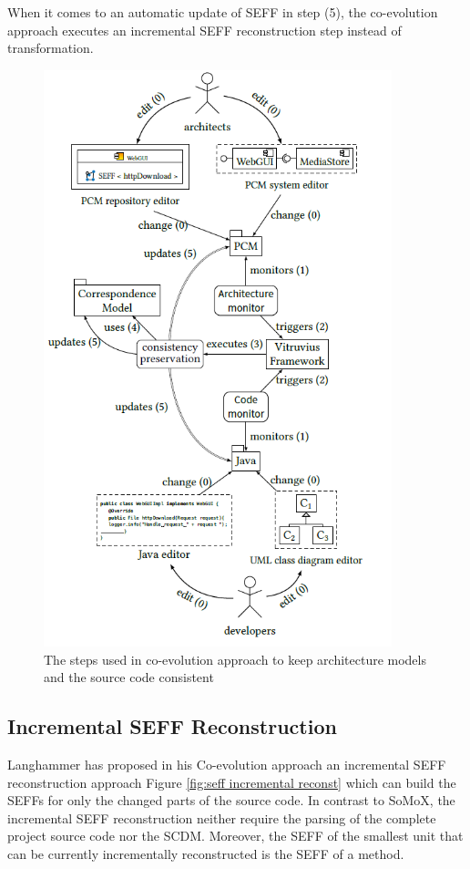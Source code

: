 When it comes to an automatic update of SEFF in step (5), the co-evolution approach executes an incremental SEFF reconstruction step instead of transformation. 


\begin{figure}[h]
\centering
\includegraphics[width=0.9\textwidth]{figures/coevolution_approach}
\caption{The steps used in co-evolution approach to keep architecture models and the source code consistent \cite{langhammer2015co}}
\label{fig:coevoloution approach}
\end{figure}

\subsection{Incremental SEFF Reconstruction}
\label{sec:Incremental SEFF Reconstruction}
Langhammer has proposed in his Co-evolution approach an incremental SEFF reconstruction approach Figure \ref{fig:seff incremental reconst} which can build the SEFFs for only the changed parts of the source code. In contrast to SoMoX, the incremental SEFF reconstruction neither require the parsing of the complete project source code nor the SCDM. Moreover, the SEFF of the smallest unit that can be currently incrementally reconstructed is the SEFF of a method. 

